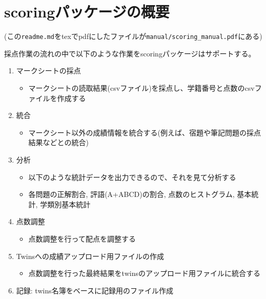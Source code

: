 \def\latexktupreamblefile{scoring_manual.ktu_preamble}
\def\mytitle{scoringパッケージ}
\def\myauthor{山本}
\def\mydate{2019.6.25}
\def\latexxspacing{no}


\newcommand {\mycolor }{olive}

\section{scoringパッケージの概要}
\label{scoringパッケージの概要}

(この\texttt{readme.md}をtexでpdfにしたファイルが\texttt{manual\slash scoring\_manual.pdf}にある)

採点作業の流れの中で以下のような作業をscoringパッケージはサポートする。

\begin{enumerate}
\item マークシートの採点

\begin{itemize}
\item マークシートの読取結果(csvファイル)を採点し、学籍番号と点数のcsvファイルを作成する

\end{itemize}

\item 統合

\begin{itemize}
\item マークシート以外の成績情報を統合する(例えば、宿題や筆記問題の採点結果などとの統合)

\end{itemize}

\item 分析

\begin{itemize}
\item 以下のような統計データを出力できるので、それを見て分析する

\item 各問題の正解割合, 評語(A+ABCD)の割合, 点数のヒストグラム, 基本統計, 学類別基本統計

\end{itemize}

\item 点数調整

\begin{itemize}
\item 点数調整を行って配点を調整する

\end{itemize}

\item Twinsへの成績アップロード用ファイルの作成

\begin{itemize}
\item 点数調整を行った最終結果をtwinsのアップロード用ファイルに統合する

\end{itemize}

\item 記録: twins名簿をベースに記録用のファイル作成

\end{enumerate}

